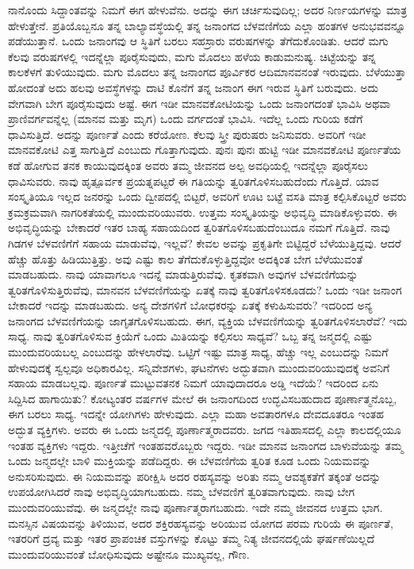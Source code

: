 ನಾನೊಂದು ಸಿದ್ದಾಂತವನ್ನು ನಿಮಗೆ ಈಗ ಹೇಳುವೆನು. ಅದನ್ನು ಈಗ ಚರ್ಚಿಸುವುದಿಲ್ಲ; ಅದರ ನಿರ್ಣಯಗಳನ್ನು ಮಾತ್ರ ಹೇಳುತ್ತೇನೆ. ಪ್ರತಿಯೊಬ್ಬನೂ ತನ್ನ ಬಾಲ್ಯಾವಸ್ಥೆಯಲ್ಲಿ ತನ್ನ ಜನಾಂಗದ ಬೆಳವಣಿಗೆಯ ಎಲ್ಲಾ ಹಂತಗಳ ಅನುಭವವನ್ನೂ ಪಡೆಯುತ್ತಾನೆ. ಒಂದು ಜನಾಂಗವು ಆ ಸ್ಥಿತಿಗೆ ಬರಲು ಸಹಸ್ರಾರು ವರುಷಗಳನ್ನು ತೆಗೆದುಕೊಂಡಿತು. ಆದರೆ ಮಗು ಕೆಲವು ವರುಷಗಳಲ್ಲಿ ಇದನ್ನೆಲ್ಲಾ ಪೂರೈಸುವುದು, ಮಗು ಮೊದಲು ಹಳೆಯ ಕಾಡುಮನುಷ್ಯ. ಚಿಟ್ಟೆಯನ್ನು ತನ್ನ ಕಾಲಕೆಳಗೆ ತುಳಿಯುವುದು. ಮಗು ಮೊದಲು ತನ್ನ ಜನಾಂಗದ ಪೂರ್ವಿಕರ ಆದಿಮಾನವನಂತೆ ಇರುವುದು. ಬೆಳೆಯುತ್ತಾ ಹೋದಂತೆ ಅದು ಹಲವು ಅವಸ್ಥೆಗಳನ್ನು ದಾಟಿ ಕೊನೆಗೆ ತನ್ನ ಜನಾಂಗ ಈಗ ಇರುವ ಸ್ಥಿತಿಗೆ ಬರುವುದು. ಅದು ವೇಗವಾಗಿ ಬೇಗ ಪೂರೈಸುವುದು ಅಷ್ಟೆ. ಈಗ ಇಡೀ ಮಾನವಕೋಟಿಯನ್ನು ಒಂದು ಜನಾಂಗದಂತೆ ಭಾವಿಸಿ ಅಥವಾ ಪ್ರಾಣಿವರ್ಗವನ್ನೆಲ್ಲ (ಮಾನವ ಮತ್ತು ಮೃಗ) ಒಂದು ವರ್ಗದಂತೆ ಭಾವಿಸಿ. ಇದೆಲ್ಲ ಒಂದು ಗುರಿಯ ಕಡೆಗೆ ಧಾವಿಸುತ್ತಿದೆ. ಅದನ್ನು ಪೂರ್ಣತೆ ಎಂದು ಕರೆಯೋಣ. ಕೆಲವು ಸ್ತ್ರೀ ಪುರುಷರು ಜನಿಸುವರು. ಅವರಿಗೆ ಇಡೀ ಮಾನವಕೋಟಿ ಎತ್ತ ಸಾಗುತ್ತಿದೆ ಎಂಬುದು ಗೊತ್ತಾಗುವುದು. ಪುನಃ ಪುನಃ ಹುಟ್ಟಿ ಇಡೀ ಮಾನವಕೋಟಿ ಪೂರ್ಣತೆಯ ಕಡೆ ಹೋಗುವ ತನಕ ಕಾಯುವುದಕ್ಕಿಂತ ಅವರು ತಮ್ಮ ಜೀವನದ ಅಲ್ಪ ಅವಧಿಯಲ್ಲಿ ಇದನ್ನೆಲ್ಲಾ ಪೂರೈಸಲು ಧಾವಿಸುವರು. ನಾವು ಹೃತ್ಪೂರ್ವಕ ಪ್ರಯತ್ನಪಟ್ಟರೆ ಈ ಗತಿಯನ್ನು ತ್ವರಿತಗೊಳಿಸಬಹುದೆಂದು ಗೊತ್ತಿದೆ. ಯಾವ ಸಂಸ್ಕೃತಿಯೂ ಇಲ್ಲದ ಜನರನ್ನು ಒಂದು ದ್ವೀಪದಲ್ಲಿ ಬಿಟ್ಟರೆ, ಅವರಿಗೆ ಊಟ ಬಟ್ಟೆ ವಸತಿ ಮಾತ್ರ ಕಲ್ಪಿಸಿಕೊಟ್ಟರೆ ಅವರು ಕ್ರಮಕ್ರಮವಾಗಿ ನಾಗರಿಕತೆಯಲ್ಲಿ ಮುಂದುವರಿಯುವರು. ಉತ್ತಮ ಸಂಸ್ಕೃತಿಯನ್ನು ಅಭಿವೃದ್ಧಿ ಮಾಡಿಕೊಳ್ಳುವರು. ಈ ಅಭಿವೃದ್ಧಿಯನ್ನು ಬೇಕಾದರೆ ಇತರ ಬಾಹ್ಯ ಸಹಾಯದಿಂದ ತ್ವರಿತಗೊಳಿಸಬಹುದೆಂಬುದೂ ನಮಗೆ ಗೊತ್ತಿದೆ. ನಾವು ಗಿಡಗಳ ಬೆಳವಣಿಗೆಗೆ ಸಹಾಯ ಮಾಡುವೆವು, ಇಲ್ಲವೆ? ಕೇವಲ ಅವನ್ನು ಪ್ರಕೃತಿಗೇ ಬಿಟ್ಟಿದ್ದರೆ ಬೆಳೆಯುತ್ತಿದ್ದವು. ಆದರೆ ಹೆಚ್ಚು ಹೊತ್ತು ಹಿಡಿಯುತ್ತಿತ್ತು. ಅವು ಎಷ್ಟು ಕಾಲ ತೆಗೆದುಕೊಳ್ಳುತ್ತಿದ್ದವೋ ಅದಕ್ಕಿಂತ ಬೇಗ ಬೆಳೆಯುವಂತೆ ಮಾಡಬಹುದು. ನಾವು ಯಾವಾಗಲೂ ಇದನ್ನೆ ಮಾಡುತ್ತಿರುವೆವು. ಕೃತಕವಾಗಿ ಅವುಗಳ ಬೆಳವಣಿಗೆಯನ್ನು ತ್ವರಿತಗೊಳಿಸುತ್ತಿರುವೆವು, ಮಾನವನ ಬೆಳವಣಿಗೆಯನ್ನು ಏತಕ್ಕೆ ನಾವು ತ್ವರಿತಗೊಳಿಸಕೂಡದು? ಒಂದು ಇಡೀ ಜನಾಂಗ ಬೇಕಾದರೆ ಇದನ್ನು ಮಾಡಬಹುದು. ಅನ್ಯ ದೇಶಗಳಿಗೆ ಬೋಧಕರನ್ನು ಏತಕ್ಕೆ ಕಳುಹಿಸುವರು? ಇದರಿಂದ ಅನ್ಯ ಜನಾಂಗದ ಬೆಳವಣಿಗೆಯನ್ನು ಜಾಗೃತಗೊಳಿಸಬಹುದು. ಈಗ, ವ್ಯಕ್ತಿಯ ಬೆಳವಣಿಗೆಯನ್ನು ತ್ವರಿತಗೊಳಿಸಲಾರೆವೆ? ಇದು ಸಾಧ್ಯ. ನಾವು ತ್ವರಿತಗೊಳಿಸುವ ಕ್ರಿಯೆಗೆ ಒಂದು ಮಿತಿಯನ್ನು ಕಲ್ಪಿಸಲು ಸಾಧ್ಯವೆ? ಒಬ್ಬ ತನ್ನ ಜನ್ಮದಲ್ಲಿ ಎಷ್ಟು ಮುಂದುವರಿಯಬಲ್ಲ ಎಂಬುದನ್ನು ಹೇಳಲಾರೆವು. ಒಟ್ಟಿಗೆ ಇಷ್ಟು ಮಾತ್ರ ಸಾಧ್ಯ, ಹೆಚ್ಚು ಇಲ್ಲ ಎಂಬುದನ್ನು ನಿಮಗೆ ಹೇಳುವುದಕ್ಕೆ ಸ್ವಲ್ಪವೂ ಅಧಿಕಾರವಿಲ್ಲ. ಸನ್ನಿವೇಶಗಳು, ಘಟನೆಗಳು ಅದ್ಭುತವಾಗಿ ಮುಂದುವರಿಯುವುದಕ್ಕೆ ಅವನಿಗೆ ಸಹಾಯ ಮಾಡಬಲ್ಲವು. ಪೂರ್ಣತೆ ಮುಟ್ಟುವತನಕ ನಿಮಗೆ ಯಾವುದಾದರೂ ಅಡ್ಡಿ ಇದೆಯೆ? ಇದರಿಂದ ಏನು ಸಿದ್ದಿಸಿದ ಹಾಗಾಯಿತು? ಕೋಟ್ಯಂತರ ವರ್ಷಗಳ ಮೇಲೆ ಈ ಜನಾಂಗದಿಂದ ಉದ್ಭವಿಸಬಹುದಾದ ಪೂರ್ಣಾತ್ಮನೊಬ್ಬ, ಈಗ ಬರಲು ಸಾಧ್ಯ. ಇದನ್ನೇ ಯೋಗಿಗಳು ಹೇಳುವುದು. ಎಲ್ಲಾ ಮಹಾ ಅವತಾರಗಳೂ ದೇವದೂತರೂ ಇಂತಹ ಅದ್ಭುತ ವ್ಯಕ್ತಿಗಳು. ಅವರು ಈ ಒಂದು ಜನ್ಮದಲ್ಲಿ ಪೂರ್ಣಾತ್ಮರಾದವರು. ಜಗದ ಇತಿಹಾಸದಲ್ಲಿ ಎಲ್ಲಾ ಕಾಲದಲ್ಲಿಯೂ ಇಂತಹ ವ್ಯಕ್ತಿಗಳು ಇದ್ದರು. ಇತ್ತೀಚೆಗೆ ಇಂತಹವರೊಬ್ಬರು ಇದ್ದರು. ಇಡೀ ಮಾನವ ಜನಾಂಗದ ಬಾಳುವೆಯನ್ನು ತಮ್ಮ ಒಂದು ಜನ್ಮದಲ್ಲೇ ಬಾಳಿ ಮುಕ್ತಿಯನ್ನು ಪಡೆದಿದ್ದರು. ಈ ಬೆಳವಣಿಗೆಯ ತ್ವರಿತ ಕೂಡ ಒಂದು ನಿಯಮವನ್ನು ಅನುಸರಿಸುವುದು. ಈ ನಿಯಮವನ್ನು ಪರೀಕ್ಷಿಸಿ ಅದರ ರಹಸ್ಯವನ್ನು ಅರಿತು ನಮ್ಮ ಆವಶ್ಯಕತೆಗೆ ತಕ್ಕಂತೆ ಅದನ್ನು ಉಪಯೋಗಿಸಿದರೆ ನಾವು ಅಭಿವೃದ್ಧಿಯಾಗಬಹುದು. ನಮ್ಮ ಬೆಳವಣಿಗೆ ತ್ವರಿತವಾಗುವುದು. ನಾವು ಬೇಗ ಮುಂದುವರಿಯುವೆವು. ಈ ಜನ್ಮದಲ್ಲೇ ನಾವು ಪೂರ್ಣಾತ್ಮರಾಗಬಹುದು. ಇದೇ ನಮ್ಮ ಜೀವನದ ಉತ್ತಮ ಭಾಗ. ಮನಸ್ಸಿನ ವಿಷಯವನ್ನು ತಿಳಿಯುವ, ಅದರ ಶಕ್ತಿರಹಸ್ಯವನ್ನು ಅರಿಯುವ ಯೋಗದ ಪರಮ ಗುರಿಯೆ ಈ ಪೂರ್ಣತೆ, ಇತರರಿಗೆ ದ್ರವ್ಯ ಮತ್ತು ಇತರ ಪ್ರಾಪಂಚಿಕ ವಸ್ತುಗಳನ್ನು ಕೊಟ್ಟು ತಮ್ಮ ನಿತ್ಯ ಜೀವನದಲ್ಲಿಯೆ ಘರ್ಷಣೆಯಿಲ್ಲದೆ ಮುಂದುವರಿಯುವಂತೆ ಬೋಧಿಸುವುದು ಅಷ್ಟೇನೂ ಮುಖ್ಯವಲ್ಲ, ಗೌಣ.

